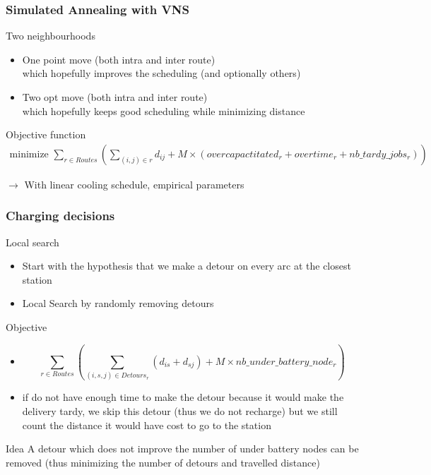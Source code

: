 \documentclass{beamer}
\begin{document}
\begin{frame}
    \frametitle{Simulated Annealing with VNS}
    \begin{block}{Two neighbourhoods}
        \begin{itemize}
            \item One point move (both intra and inter route)\\which hopefully improves the scheduling (and optionally others)
            \item Two opt move (both intra and inter route)\\which hopefully keeps good scheduling while minimizing distance
        \end{itemize}
    \end{block}
    \begin{block}{Objective function}
        \tiny
        \begin{align*}
            \textrm{minimize }\sum_{r\in Routes} \left(
                \sum_{(i,j)\in r} d_{ij}
                + M\times (
                    overcapactitated_r
                    + overtime_r
                    + nb\_tardy\_jobs_r
                )
            \right)
        \end{align*}
    \end{block}
    $\rightarrow$ With linear cooling schedule, empirical parameters
\end{frame}

\begin{frame}
    \frametitle{Charging decisions}
    \begin{block}{Local search}
        \begin{itemize}
            \item Start with the hypothesis that we make a detour on every arc at the closest station
            \item Local Search by randomly removing detours
        \end{itemize}
    \end{block}
    \begin{block}{Objective}
        \begin{itemize}
            \item {\tiny\[
                \sum_{r\in Routes} \left( \sum_{(i,s,j)\in Detours_r} (d_{is}+d_{sj}) + M\times nb\_under\_battery\_node_r \right)
            \]}
            \item if do not have enough time to make the detour because it would make the delivery tardy, we skip this detour (thus we do not recharge) but we still count the distance it would have cost to go to the station
        \end{itemize}
    \end{block}
    \begin{exampleblock}{Idea}
        A detour which does not improve the number of under battery nodes can be removed (thus minimizing the number of detours and travelled distance)
    \end{exampleblock}
\end{frame}
\end{document}
